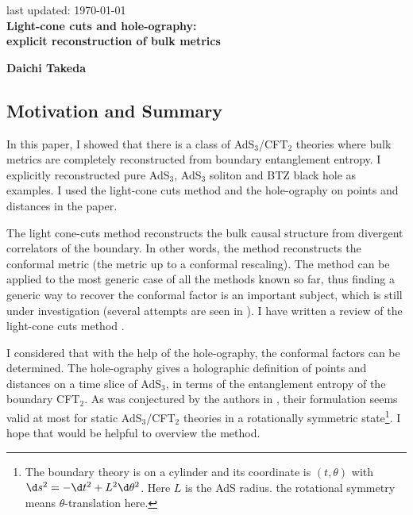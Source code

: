 \documentclass[12pt]{article}
\renewcommand{\thefootnote}{\fnsymbol{footnote}}
\begin{document}
{\Large{}
\hfill{\normalsize last updated: \today}
\\[2mm]
\textbf{Light-cone cuts and hole-ography:\\explicit reconstruction of bulk metrics
\cite{Takeda:2021dsl}
}
}

\noindent
\hfill
\textbf{Daichi Takeda}%

\renewcommand{\thefootnote}{\arabic{footnote})}
\setcounter{footnote}{0}
\vspace{12pt}
\subsection*{Motivation and Summary}
In this paper, I showed that there is a class of AdS$_3$/CFT$_2$ theories where bulk metrics are completely
reconstructed from boundary entanglement entropy.
I explicitly reconstructed pure AdS$_3$, AdS$_3$ soliton and BTZ black hole as examples.
I used the light-cone cuts method \cite{Engelhardt:2016wgb} and the hole-ography on points and distances \cite{Czech:2014ppa} in the paper.


The light cone-cuts method reconstructs the bulk causal structure from divergent correlators of the boundary.
In other words, the method reconstructs the conformal metric (the metric up to a conformal rescaling).
The method can be applied to the most generic case of all the methods known so far,
thus finding a generic way to recover the conformal factor is an important subject,
which is still under investigation (several attempts are seen in \cite{Engelhardt:2016crc}).
I have written a review of the light-cone cuts method
\href{https://albertmcc.github.io/web/reviews/light_cone1.pdf}{\color{blue}{here}}.

I considered that with the help of the hole-ography, the conformal factors can be determined.
The hole-ography gives a holographic definition of points and distances on a time slice of AdS$_3$,
in terms of the entanglement entropy of the boundary CFT$_2$.
As was conjectured by the authors in \cite{Czech:2014ppa},
their formulation seems valid at most for static AdS$_3$/CFT$_2$ theories in a rotationally symmetric state\footnote{
The boundary theory is on a cylinder and its coordinate is $(t,\theta)$ with $\d s^2 = -\d t^2 + L^2\d\theta^2$.
Here $L$ is the AdS radius.
the rotational symmetry means $\theta$-translation here.
}.
I hope that 
\href{https://albertmcc.github.io/web/reviews/Nuts_and_Bolts_for_Creating_space.pdf}{\color{blue}{my review}}
would be helpful to overview the method.
\end{document}
